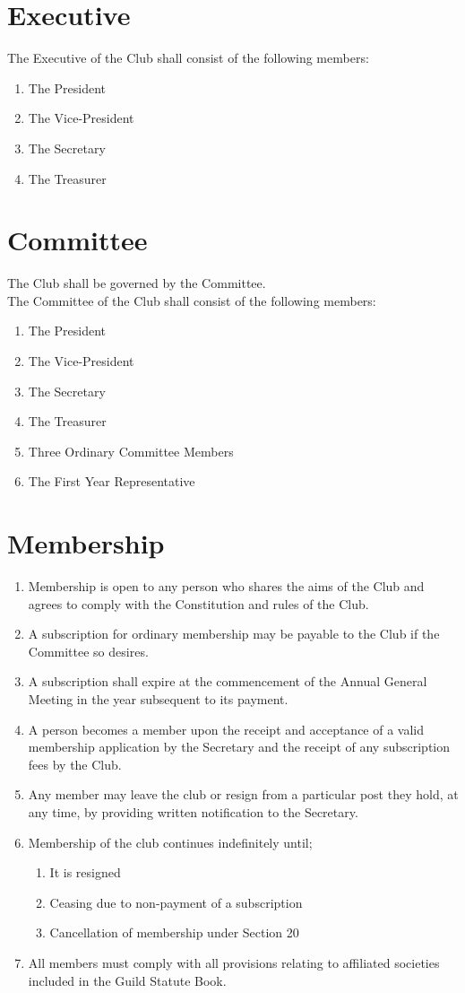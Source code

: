 \documentclass[11pt]{article} %
\begin{document}
\section{Executive}
The Executive of the Club shall consist of the following members:
\begin{enumerate}
	\item The President
	\item The Vice-President
	\item The Secretary
	\item The Treasurer
\end{enumerate}

\section{Committee}
The Club shall be governed by the Committee.\\
The Committee of the Club shall consist of the following members:
\begin{enumerate}
	\item The President
	\item The Vice-President
	\item The Secretary
	\item The Treasurer
	\item Three Ordinary Committee Members
	\item The First Year Representative
\end{enumerate}

\section{Membership}
\begin{enumerate}
	\item Membership is open to any person who shares the aims of the Club and agrees to comply with the Constitution and rules of the Club.
	\item A subscription for ordinary membership may be payable to the Club if the Committee so desires.
	\item A subscription shall expire at the commencement of the Annual General Meeting in the year subsequent to its payment.
	\item A person becomes a member upon the receipt and acceptance of a valid membership application by the Secretary and the receipt of any subscription fees by the Club.
	\item Any member may leave the club or resign from a particular post they hold, at any time, by providing written notification to the Secretary.
	\item Membership of the club continues indefinitely until;
		\begin{enumerate}[1.]
		\item It is resigned
		\item Ceasing due to non-payment of a subscription
		\item Cancellation of membership under Section 20
		\end{enumerate}
	\item All members must comply with all provisions relating to affiliated societies included in the Guild Statute Book.
\end{enumerate}
\end{document}
